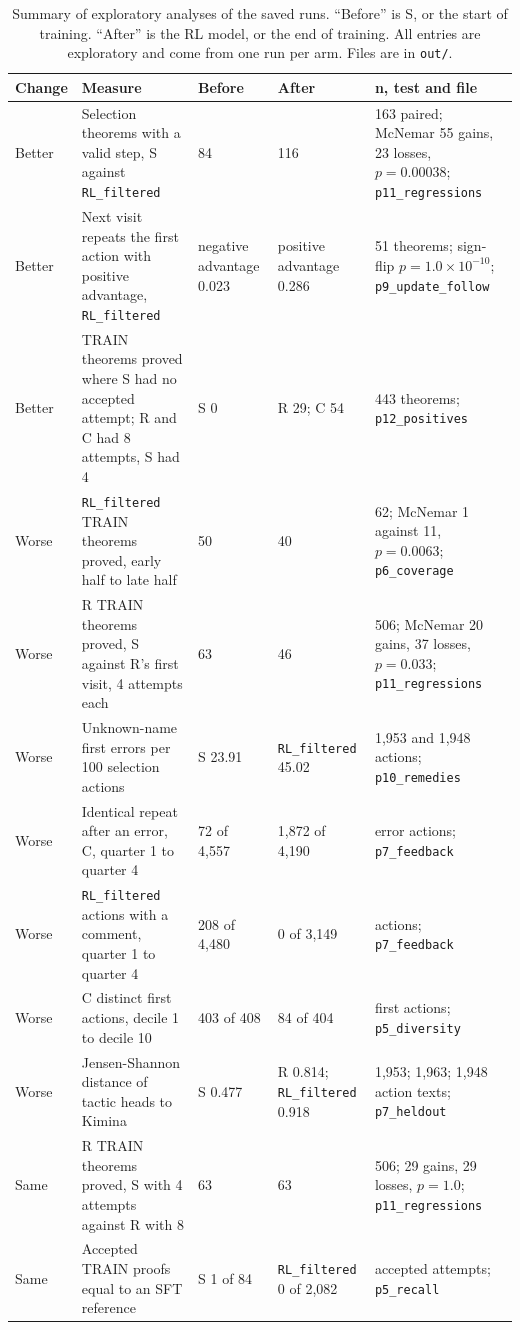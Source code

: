 \documentclass[11pt]{article}
\newcommand{\code}[1]{\texttt{#1}}
\newcommand{\pth}[1]{\nolinkurl{#1}}
\begin{document}
\begin{table}[!htbp]
\centering
\small
\caption{Summary of exploratory analyses of the saved runs. ``Before'' is S, or the start of training. ``After'' is the RL model, or the end of training. All entries are exploratory and come from one run per arm. Files are in \pth{out/}.}
\label{tab:oct21-scorecard}
\begin{tabularx}{\textwidth}{@{}P{1.3cm}YP{2.0cm}P{2.3cm}P{3.4cm}@{}}
\toprule
Change & Measure & Before & After & n, test and file \\
\midrule
Better & Selection theorems with a valid step, S against \code{RL\_filtered} & 84 & 116 & 163 paired; McNemar 55 gains, 23 losses, $p = 0.00038$; \pth{p11_regressions} \\
Better & Next visit repeats the first action with positive advantage, \code{RL\_filtered} & negative advantage 0.023 & positive advantage 0.286 & 51 theorems; sign-flip $p = 1.0 \times 10^{-10}$; \pth{p9_update_follow} \\
Better & TRAIN theorems proved where S had no accepted attempt; R and C had 8 attempts, S had 4 & S 0 & R 29; C 54 & 443 theorems; \pth{p12_positives} \\
Worse & \code{RL\_filtered} TRAIN theorems proved, early half to late half & 50 & 40 & 62; McNemar 1 against 11, $p = 0.0063$; \pth{p6_coverage} \\
Worse & R TRAIN theorems proved, S against R's first visit, 4 attempts each & 63 & 46 & 506; McNemar 20 gains, 37 losses, $p = 0.033$; \pth{p11_regressions} \\
Worse & Unknown-name first errors per 100 selection actions & S 23.91 & \code{RL\_filtered} 45.02 & 1,953 and 1,948 actions; \pth{p10_remedies} \\
Worse & Identical repeat after an error, C, quarter 1 to quarter 4 & 72 of 4,557 & 1,872 of 4,190 & error actions; \pth{p7_feedback} \\
Worse & \code{RL\_filtered} actions with a comment, quarter 1 to quarter 4 & 208 of 4,480 & 0 of 3,149 & actions; \pth{p7_feedback} \\
Worse & C distinct first actions, decile 1 to decile 10 & 403 of 408 & 84 of 404 & first actions; \pth{p5_diversity} \\
Worse & Jensen-Shannon distance of tactic heads to Kimina & S 0.477 & R 0.814; \code{RL\_filtered} 0.918 & 1,953; 1,963; 1,948 action texts; \pth{p7_heldout} \\
Same & R TRAIN theorems proved, S with 4 attempts against R with 8 & 63 & 63 & 506; 29 gains, 29 losses, $p = 1.0$; \pth{p11_regressions} \\
Same & Accepted TRAIN proofs equal to an SFT reference & S 1 of 84 & \code{RL\_filtered} 0 of 2,082 & accepted attempts; \pth{p5_recall} \\
\bottomrule
\end{tabularx}
\end{table}
\end{document}
